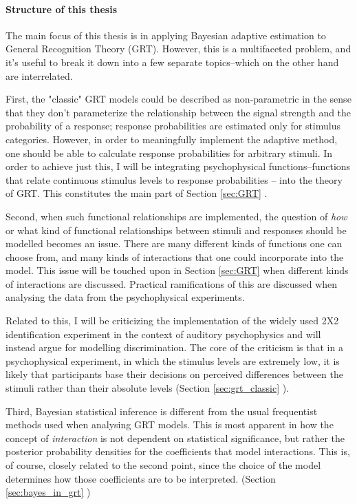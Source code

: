 \documentclass{article}\usepackage{knitr}
\begin{document}
\paragraph{Structure of this thesis}

The main focus of this thesis is in applying Bayesian adaptive estimation to General Recognition Theory (GRT). However, this is a multifaceted problem, and it's useful to break it down into a few separate topics--which on the other hand are interrelated.

First, the "classic" GRT models could be described as non-parametric in the sense that they don't parameterize the relationship between the signal strength and the probability of a response; response probabilities are estimated only for stimulus categories. However, in order to meaningfully implement the adaptive method, one should be able to calculate response probabilities for arbitrary stimuli. In order to achieve just this, I will be integrating psychophysical functions--functions that relate continuous stimulus levels to response probabilities \citep[Chapter 4]{kingdomprins2010}-- into the theory of GRT. This constitutes the main part of Section \ref{sec:GRT} \textit{}.  

Second, when such functional relationships are implemented, the question of \textit{how} or what kind of functional relationships between stimuli and responses should be modelled becomes an issue. There are many different kinds of functions one can choose from, and many kinds of interactions that one could incorporate into the model. This issue will be touched upon in Section \ref{sec:GRT} when different kinds of interactions are discussed. Practical ramifications of this are discussed when analysing the data from the psychophysical experiments. 

Related to this, I will be criticizing the implementation of the widely used 2X2 identification experiment in the context of auditory psychophysics and will instead argue for modelling discrimination. The core of the criticism is that in a psychophysical experiment, in which the stimulus levels are extremely low, it is likely that participants base their decisions on perceived differences between the stimuli rather than their absolute levels (Section \ref{sec:grt_classic} \textit{}).

Third, Bayesian statistical inference is different from the usual frequentist methods used when analysing GRT models. This is most apparent in how the concept of \textit{interaction} is not dependent on statistical significance, but rather the posterior probability densities for the coefficients that model interactions. This is, of course, closely related to the second point, since the choice of the model determines how those coefficients are to be interpreted. (Section \ref{sec:bayes_in_grt} \textit{})
\end{document}
